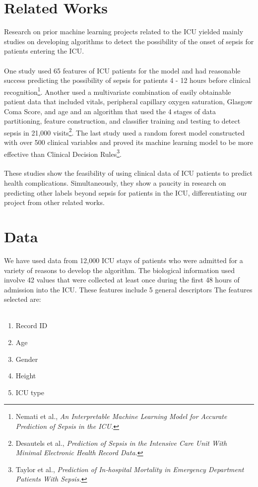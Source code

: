 \documentclass[12pt, letterpaper]{article}
\begin{document}
\section{Related Works}
Research on prior machine learning projects related to the ICU yielded mainly studies on developing algorithms to detect the possibility of the onset of sepsis for patients entering the ICU. \\
\\
One study used 65 features of ICU patients for the model and had reasonable success predicting the possibility of sepsis for patients 4 - 12 hours before clinical recognition\footnote{Nemati et al., \textit{An Interpretable Machine Learning Model for Accurate Prediction of Sepsis in the ICU.}}. Another used a multivariate combination of easily obtainable patient data that included vitals, peripheral capillary oxygen saturation, Glasgow Coma Score, and age and an algorithm that used the 4 stages of data partitioning, feature construction, and classifier training and testing to detect sepsis in 21,000 visits\footnote{Desautels et al., \textit{Prediction of Sepsis in the Intensive Care Unit With Minimal Electronic Health Record Data.}}. The last study used a random forest model constructed with over 500 clinical variables and proved its machine learning model to be more effective than Clinical Decision Rules\footnote{Taylor et al., \textit{Prediction of In‐hospital Mortality in Emergency Department Patients With Sepsis.}}. \\
\\
These studies show the feasibility of using clinical data of ICU patients to predict health complications. Simultaneously, they show a paucity in research on predicting other labels beyond sepsis for patients in the ICU, differentiating our project from other related works. \\

\section{Data}
We have used data from 12,000 ICU stays of patients who were admitted for a variety of reasons to develop the algorithm. The biological information used involve 42 values that were collected at least once during the first 48 hours of admission into the ICU. These features include 5 general descriptors The features selected are: \\
\\
\begin{enumerate}
  \item Record ID
  \item Age
  \item Gender
  \item Height
  \item ICU type \\
\end{enumerate}
\end{document}
